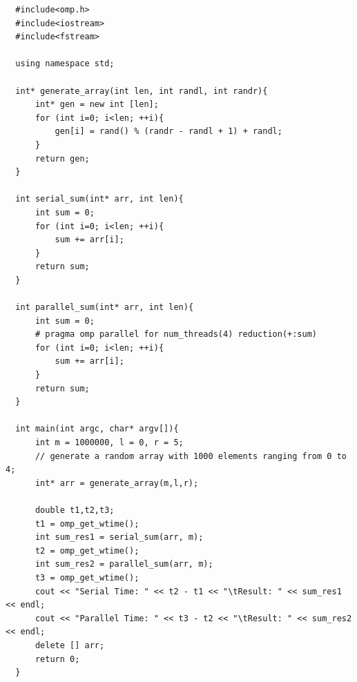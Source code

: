\begin{verbatim}
  #include<omp.h>
  #include<iostream>
  #include<fstream>

  using namespace std; 

  int* generate_array(int len, int randl, int randr){
      int* gen = new int [len];
      for (int i=0; i<len; ++i){
          gen[i] = rand() % (randr - randl + 1) + randl;
      }
      return gen;
  }

  int serial_sum(int* arr, int len){
      int sum = 0;
      for (int i=0; i<len; ++i){
          sum += arr[i];
      }
      return sum;
  }

  int parallel_sum(int* arr, int len){
      int sum = 0;
      # pragma omp parallel for num_threads(4) reduction(+:sum)
      for (int i=0; i<len; ++i){
          sum += arr[i];
      }
      return sum;
  }

  int main(int argc, char* argv[]){
      int m = 1000000, l = 0, r = 5;
      // generate a random array with 1000 elements ranging from 0 to 4;
      int* arr = generate_array(m,l,r);

      double t1,t2,t3;
      t1 = omp_get_wtime();
      int sum_res1 = serial_sum(arr, m);
      t2 = omp_get_wtime();
      int sum_res2 = parallel_sum(arr, m);
      t3 = omp_get_wtime();
      cout << "Serial Time: " << t2 - t1 << "\tResult: " << sum_res1 << endl;
      cout << "Parallel Time: " << t3 - t2 << "\tResult: " << sum_res2 << endl;
      delete [] arr;
      return 0;
  }
\end{verbatim}